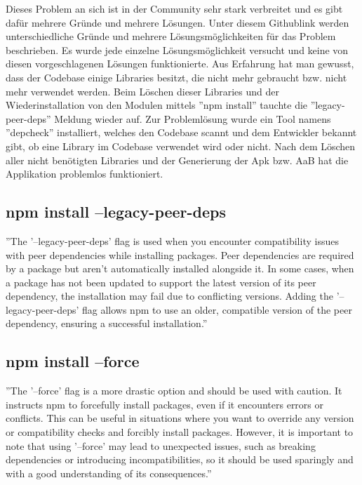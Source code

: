 Dieses Problem an sich ist in der Community sehr stark verbreitet und es gibt dafür mehrere Gründe und mehrere Lösungen.
Unter diesem Githublink \cite{libjsexecutor} werden unterschiedliche Gründe und mehrere
Lösungsmöglichkeiten für das Problem beschrieben.
Es wurde jede einzelne Lösungsmöglichkeit versucht und keine von diesen vorgeschlagenen Lösungen
funktionierte.
Aus Erfahrung hat man gewusst, dass der Codebase einige Libraries besitzt,
die nicht mehr gebraucht bzw.
nicht mehr verwendet werden. Beim Löschen dieser Libraries und der Wiederinstallation
von den Modulen mittels ''npm install'' tauchte die ''legacy-peer-deps'' Meldung wieder auf.
Zur Problemlösung wurde ein Tool namens ''depcheck'' installiert,
welches den Codebase scannt und dem Entwickler bekannt gibt, ob eine Library im Codebase verwendet
wird oder nicht. \cite{depcheck}
Nach dem Löschen aller nicht benötigten Libraries und der Generierung der
Apk bzw.
AaB hat die Applikation problemlos funktioniert.



\subsection{npm install --legacy-peer-deps}\label{subsec:npm-install---legacy-peer-deps}
''The '--legacy-peer-deps' flag is used when you encounter compatibility issues with peer dependencies
while installing packages.
Peer dependencies are required by a package but aren't automatically
installed alongside it.
In some cases, when a package has not been updated to support the latest
version of its peer dependency, the installation may fail due to conflicting versions.
Adding the '--legacy-peer-deps' flag allows npm to use an older, compatible version of
the peer dependency, ensuring a successful installation.''
\cite{installFlags}


\subsection{npm install --force}\label{subsec:npm-install---force}
''The '--force'  flag is a more drastic option and should be used with caution.
It instructs npm to forcefully install packages, even if it encounters errors or conflicts.
This can be useful in situations where you want to override any version or compatibility checks
and forcibly install packages.
However, it is important to note that using '--force'
may lead to unexpected issues, such as breaking dependencies or introducing incompatibilities,
so it should be used sparingly and with a good understanding of its consequences.''
\cite{installFlags}




